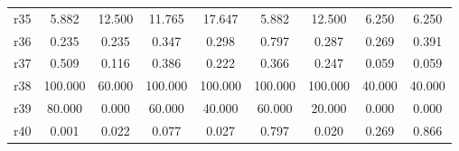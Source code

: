 \begin{table}[htbp]
\begin{tabular}{lcccccccc}
r35 &     5.882 &    12.500 &    11.765 &    17.647 &     5.882 &    12.500 &     6.250 &     6.250 \\  
r36 &     0.235 &     0.235 &     0.347 &     0.298 &     0.797 &     0.287 &     0.269 &     0.391 \\  
r37 &     0.509 &     0.116 &     0.386 &     0.222 &     0.366 &     0.247 &     0.059 &     0.059 \\  
r38 &   100.000 &    60.000 &   100.000 &   100.000 &   100.000 &   100.000 &    40.000 &    40.000 \\  
r39 &    80.000 &     0.000 &    60.000 &    40.000 &    60.000 &    20.000 &     0.000 &     0.000 \\  
r40 &     0.001 &     0.022 &     0.077 &     0.027 &     0.797 &     0.020 &     0.269 &     0.866 \\  
\hline \hline \end{tabular}
\end{table}
